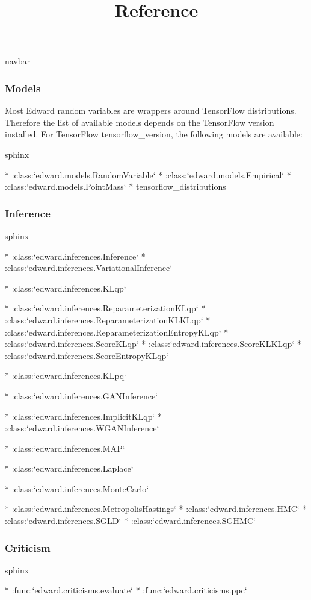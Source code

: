 \title{Reference}

{{navbar}}

\subsubsection{Models}

Most Edward random variables are wrappers around TensorFlow distributions.
Therefore the list of available models depends on the TensorFlow version
installed. For TensorFlow {{tensorflow_version}}, the following models are
available:

{{sphinx

* :class:`edward.models.RandomVariable`
* :class:`edward.models.Empirical`
* :class:`edward.models.PointMass`
* {tensorflow_distributions}

}}

\subsubsection{Inference}

{{sphinx

* :class:`edward.inferences.Inference`
* :class:`edward.inferences.VariationalInference`

  * :class:`edward.inferences.KLqp`

    * :class:`edward.inferences.ReparameterizationKLqp`
    * :class:`edward.inferences.ReparameterizationKLKLqp`
    * :class:`edward.inferences.ReparameterizationEntropyKLqp`
    * :class:`edward.inferences.ScoreKLqp`
    * :class:`edward.inferences.ScoreKLKLqp`
    * :class:`edward.inferences.ScoreEntropyKLqp`


  * :class:`edward.inferences.KLpq`

  * :class:`edward.inferences.GANInference`

    * :class:`edward.inferences.ImplicitKLqp`
    * :class:`edward.inferences.WGANInference`

  * :class:`edward.inferences.MAP`

    * :class:`edward.inferences.Laplace`

* :class:`edward.inferences.MonteCarlo`

  * :class:`edward.inferences.MetropolisHastings`
  * :class:`edward.inferences.HMC`
  * :class:`edward.inferences.SGLD`
  * :class:`edward.inferences.SGHMC`

}}

\subsubsection{Criticism}

{{sphinx

* :func:`edward.criticisms.evaluate`
* :func:`edward.criticisms.ppc`

}}